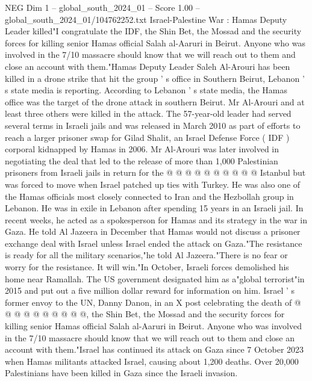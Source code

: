 \begin{textsample}{NEG Dim 1 – global\_south\_2024\_01 – Score 1.00 – global\_south\_2024\_01/104762252.txt}  \label{ex:f1_neg_333}
Israel-Palestine War : Hamas Deputy Leader killed"I congratulate the IDF, the Shin Bet, the Mossad and the security forces for killing senior Hamas official Salah al-Aaruri in Beirut.
Anyone who was involved in the 7/10 massacre should know that we will reach out to them and close an account with them."Hamas Deputy Leader Saleh Al-Arouri has been killed in a drone strike that hit the group ' s office in Southern Beirut, Lebanon ' s state media is reporting.
According to Lebanon ' s state media, the Hamas office was the target of the drone attack in southern Beirut.
Mr Al-Arouri and at least three others were killed in the attack.
The 57-year-old leader had served several terms in Israeli jails and was released in March 2010 as part of efforts to reach a larger prisoner swap for Gilad Shalit, an Israel Defense Force ( IDF ) corporal kidnapped by Hamas in 2006.
Mr Al-Arouri was later involved in negotiating the deal that led to the release of more than 1,000 Palestinian prisoners from Israeli jails in return for the @ @ @ @ @ @ @ @ @ @ Istanbul but was forced to move when Israel patched up ties with Turkey.
He was also one of the Hamas officials most closely connected to Iran and the Hezbollah group in Lebanon.
He was in exile in Lebanon after spending 15 years in an Israeli jail.
In recent weeks, he acted as a spokesperson for Hamas and its strategy in the war in Gaza.
He told Al Jazeera in December that Hamas would not discuss a prisoner exchange deal with Israel unless Israel ended the attack on Gaza."The resistance is ready for all the military scenarios,"he told Al Jazeera."There is no fear or worry for the resistance.
It will win."In October, Israeli forces demolished his home near Ramallah.
The US government designated him as a"global terrorist"in 2015 and put out a five million dollar reward for information on him.
Israel ' s former envoy to the UN, Danny Danon, in an X post celebrating the death of @ @ @ @ @ @ @ @ @ @, the Shin Bet, the Mossad and the security forces for killing senior Hamas official Salah al-Aaruri in Beirut.
Anyone who was involved in the 7/10 massacre should know that we will reach out to them and close an account with them."Israel has continued its attack on Gaza since 7 October 2023 when Hamas militants attacked Israel, causing about 1,200 deaths.
Over 20,000 Palestinians have been killed in Gaza since the Israeli invasion.

\end{textsample}
